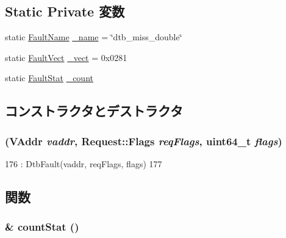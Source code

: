 \subsection*{Static Private 変数}
\begin{DoxyCompactItemize}
\item 
static \hyperlink{sim_2faults_8hh_abb196df64725e5c2568c900cf130d8d7}{FaultName} \hyperlink{classAlphaISA_1_1PDtbMissFault_ac79073ffcd2c66a09bcd3bd3ad206019}{\_\-name} = \char`\"{}dtb\_\-miss\_\-double\char`\"{}
\item 
static \hyperlink{classm5_1_1params_1_1Addr}{FaultVect} \hyperlink{classAlphaISA_1_1PDtbMissFault_ad9e5855b9db0b2824cf6c507be4a872e}{\_\-vect} = 0x0281
\item 
static \hyperlink{classStats_1_1Scalar}{FaultStat} \hyperlink{classAlphaISA_1_1PDtbMissFault_a4bff925c412f331c5aaf6a39b79619ff}{\_\-count}
\end{DoxyCompactItemize}


\subsection{コンストラクタとデストラクタ}
\hypertarget{classAlphaISA_1_1PDtbMissFault_add01ee5fb640342c0f65f9b3b79199ba}{
\subsubsection[{PDtbMissFault}]{ ({\bf VAddr} {\em vaddr}, \/  {\bf Request::Flags} {\em reqFlags}, \/  uint64\_\-t {\em flags})}}
\label{classAlphaISA_1_1PDtbMissFault_add01ee5fb640342c0f65f9b3b79199ba}



\begin{DoxyCode}
176         : DtbFault(vaddr, reqFlags, flags)
177     { }
\end{DoxyCode}


\subsection{関数}
\hypertarget{classAlphaISA_1_1PDtbMissFault_a6c79663c761ff57265459f7e3aefaf4c}{
\subsubsection[{countStat}]{\& countStat ()}}
\label{classAlphaISA_1_1PDtbMissFault_a6c79663c761ff57265459f7e3aefaf4c}


